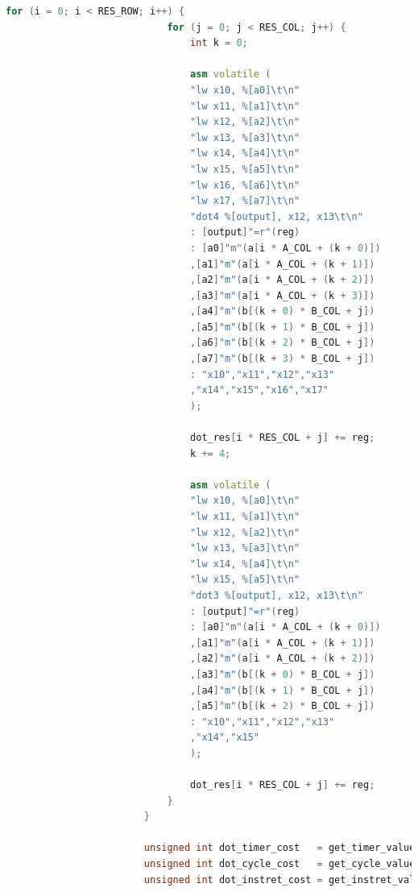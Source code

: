 \documentclass[a4paper, 14pt, oneside]{book} %
\numberwithin{equation}{subsection}
\begin{document}
\begin{enumerate}
\begin{itemize}
\begin{lstlisting}[language={C++}]
						for (i = 0; i < RES_ROW; i++) {
							for (j = 0; j < RES_COL; j++) {
								int k = 0;
								
								asm volatile (
								"lw x10, %[a0]\t\n"
								"lw x11, %[a1]\t\n"
								"lw x12, %[a2]\t\n"
								"lw x13, %[a3]\t\n"
								"lw x14, %[a4]\t\n"
								"lw x15, %[a5]\t\n"
								"lw x16, %[a6]\t\n"
								"lw x17, %[a7]\t\n"
								"dot4 %[output], x12, x13\t\n"
								: [output]"=r"(reg)
								: [a0]"m"(a[i * A_COL + (k + 0)])
								,[a1]"m"(a[i * A_COL + (k + 1)])
								,[a2]"m"(a[i * A_COL + (k + 2)])
								,[a3]"m"(a[i * A_COL + (k + 3)])
								,[a4]"m"(b[(k + 0) * B_COL + j])
								,[a5]"m"(b[(k + 1) * B_COL + j])
								,[a6]"m"(b[(k + 2) * B_COL + j])
								,[a7]"m"(b[(k + 3) * B_COL + j])
								: "x10","x11","x12","x13"
								,"x14","x15","x16","x17"
								);
								
								dot_res[i * RES_COL + j] += reg;
								k += 4;
								
								asm volatile (
								"lw x10, %[a0]\t\n"
								"lw x11, %[a1]\t\n"
								"lw x12, %[a2]\t\n"
								"lw x13, %[a3]\t\n"
								"lw x14, %[a4]\t\n"
								"lw x15, %[a5]\t\n"
								"dot3 %[output], x12, x13\t\n"
								: [output]"=r"(reg)
								: [a0]"m"(a[i * A_COL + (k + 0)])
								,[a1]"m"(a[i * A_COL + (k + 1)])
								,[a2]"m"(a[i * A_COL + (k + 2)])
								,[a3]"m"(b[(k + 0) * B_COL + j])
								,[a4]"m"(b[(k + 1) * B_COL + j])
								,[a5]"m"(b[(k + 2) * B_COL + j])
								: "x10","x11","x12","x13"
								,"x14","x15"
								);
								
								dot_res[i * RES_COL + j] += reg;			   
							}
						}
						
						unsigned int dot_timer_cost   = get_timer_value() - dot_timer_start;
						unsigned int dot_cycle_cost   = get_cycle_value() - dot_cycle_start;
						unsigned int dot_instret_cost = get_instret_value() - dot_instret_start;
						

\end{lstlisting}
\end{itemize}
\end{enumerate}
\end{document}
